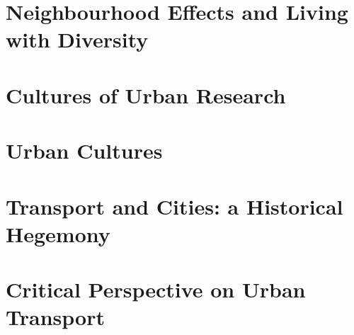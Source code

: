 \documentclass{article}
\begin{document}
\pagebreak\section{Neighbourhood Effects and Living with Diversity}

\textbf{}

\textbf{}

\textbf{}

\textbf{}

\textbf{}

\textbf{}

\textbf{}

\textbf{}

\textbf{}

\pagebreak\section{Cultures of Urban Research}

\textbf{}

\textbf{}

\textbf{}

\textbf{}

\textbf{}

\textbf{}

\textbf{}

\textbf{}

\textbf{}

\pagebreak\section{Urban Cultures}

\textbf{}

\textbf{}

\textbf{}

\textbf{}

\textbf{}

\textbf{}

\textbf{}

\textbf{}

\textbf{}

\pagebreak\section{Transport and Cities: a Historical Hegemony}

\textbf{}

\textbf{}

\textbf{}

\textbf{}

\textbf{}

\textbf{}

\textbf{}

\textbf{}

\textbf{}

\pagebreak\section{Critical Perspective on Urban Transport}

\textbf{}

\textbf{}

\textbf{}

\textbf{}

\textbf{}

\textbf{}

\textbf{}

\textbf{}

\textbf{}
\end{document}

